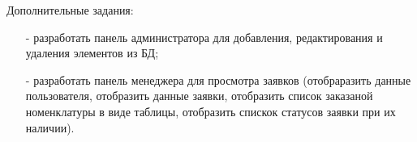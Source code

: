 Дополнительные задания:

\begin{itemize}
  \item[-] разработать панель администратора для добавления, редактирования и удаления элементов из БД;
  \item[-] разработать панель менеджера для просмотра заявков
  (отобраразить данные пользователя,
  отобразить данные заявки,
  отобразить список заказаной номенклатуры в виде таблицы,
  отобразить спискок статусов заявки при их наличии).
\end{itemize}
